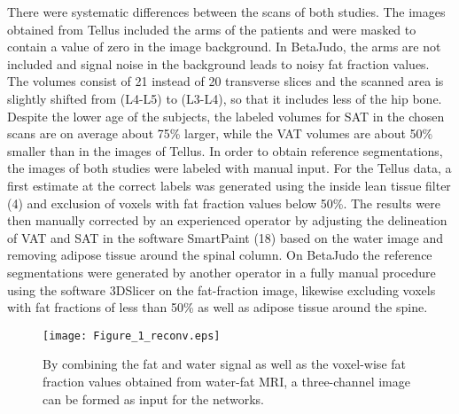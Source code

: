 \documentclass[10pt,letterpaper]{article}
\begin{document}
	There were systematic differences between the scans of both studies. The images obtained from Tellus included the arms of the patients and were masked to contain a value of zero in the image background. In BetaJudo, the arms are not included and signal noise in the background leads to noisy fat fraction values. The volumes consist of 21 instead of 20 transverse slices and the scanned area is slightly shifted from (L4-L5) to (L3-L4), so that it includes less of the hip bone. Despite the lower age of the subjects, the labeled volumes for SAT in the chosen scans are on average about 75\% larger, while the VAT volumes are about 50\% smaller than in the images of Tellus. 
	In order to obtain reference segmentations, the images of both studies were labeled with manual input. For the Tellus data, a first estimate at the correct labels was generated using the inside lean tissue filter (4) and exclusion of voxels with fat fraction values below 50\%. The results were then manually corrected by an experienced operator by adjusting the delineation of VAT and SAT in the software SmartPaint (18) based on the water image and removing adipose tissue around the spinal column. On BetaJudo the reference segmentations were generated by another operator in a fully manual procedure using the software 3DSlicer on the fat-fraction image, likewise excluding voxels with fat fractions of less than 50\% as well as adipose tissue around the spine.
	
	\begin{figure}[t] %
		
		
		\texttt{[image: Figure\_1\_reconv.eps]}
		
		\caption{By combining the fat and water signal as well as the voxel-wise fat fraction values obtained from water-fat MRI, a three-channel image can be formed as input for the networks.}
		
		\label{fig1} %
		
	\end{figure}
	
\end{document}
